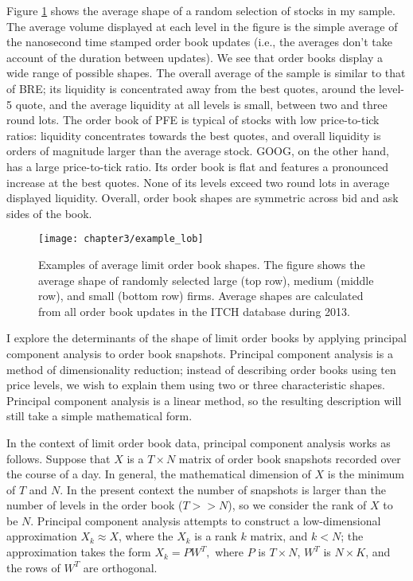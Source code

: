 	Figure \ref{fig:examples} shows the average shape of a random selection of stocks in my sample. The average volume displayed at each level in the figure is the simple average of the nanosecond time stamped order book updates (i.e., the averages don't take account of the duration between updates). We see that order books display a wide range of possible shapes. The overall average of the sample is similar to that of BRE; its liquidity is concentrated away from the best quotes, around the level-5 quote, and the average liquidity at all levels is small, between two and three round lots.  The order book of PFE is typical of stocks with low price-to-tick ratios: liquidity concentrates towards the best quotes, and overall liquidity is orders of magnitude larger than the average stock. GOOG, on the other hand, has a large price-to-tick ratio. Its order book is flat and features a pronounced increase at the best quotes. None of its levels exceed two round lots in average displayed liquidity. Overall, order book shapes are symmetric across bid and ask sides of the book.

	\begin{figure}[p]
		\linespread{1}
		\centering
		\texttt{[image: chapter3/example\_lob]}
		\captionsetup{skip=-20pt, font=footnotesize, justification=justified, width=\linewidth}
		\caption[Examples of average limit order book shapes]{Examples of average limit order book shapes. The figure shows the average shape of randomly selected large (top row), medium (middle row), and small (bottom row) firms. Average shapes are calculated from all order book updates in the ITCH database during 2013.}
		\label{fig:examples}
	\end{figure}

	I explore the determinants of the shape of limit order books by applying principal component analysis to order book snapshots. Principal component analysis is a method of dimensionality reduction; instead of describing order books using ten price levels, we wish to explain them using two or three characteristic shapes. Principal component analysis is a linear method, so the resulting description will still take a simple mathematical form.

	In the context of limit order book data, principal component analysis works as follows. Suppose that $X$ is a $T \times N$ matrix of order book snapshots recorded over the course of a day. In general, the mathematical dimension of $X$ is the minimum of $T$ and $N$. In the present context the number of snapshots is larger than the number of levels in the order book ($T >> N$), so we consider the rank of $X$ to be $N$. Principal component analysis attempts to construct a low-dimensional approximation $X_k \approx X$, where the $X_k$ is a rank $k$ matrix, and $k < N$; the approximation takes the form $X_k = P W^T,$ where $P$ is $T \times N$, $W^T$ is $N \times K$, and the rows of $W^T$ are orthogonal.

